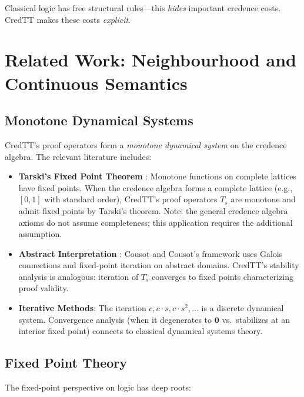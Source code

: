 \documentclass[11pt,a4paper]{article}
\newcommand{\zero}{\mathbf{0}}
\begin{document}
Classical logic has free structural rules---this \emph{hides} important credence costs. CredTT makes these costs \emph{explicit}.

\section{Related Work: Neighbourhood and Continuous Semantics}

\subsection{Monotone Dynamical Systems}

CredTT's proof operators form a \emph{monotone dynamical system} on the credence algebra. The relevant literature includes:

\begin{itemize}
    \item \textbf{Tarski's Fixed Point Theorem} \citep{tarski1955lattice}: Monotone functions on complete lattices have fixed points. When the credence algebra forms a complete lattice (e.g., $[0,1]$ with standard order), CredTT's proof operators $T_s$ are monotone and admit fixed points by Tarski's theorem. Note: the general credence algebra axioms do not assume completeness; this application requires the additional assumption.

    \item \textbf{Abstract Interpretation} \citep{cousot1979constructive}: Cousot and Cousot's framework uses Galois connections and fixed-point iteration on abstract domains. CredTT's stability analysis is analogous: iteration of $T_s$ converges to fixed points characterizing proof validity.

    \item \textbf{Iterative Methods}: The iteration $c, c \cdot s, c \cdot s^2, \ldots$ is a discrete dynamical system. Convergence analysis (when it degenerates to $\zero$ vs.\ stabilizes at an interior fixed point) connects to classical dynamical systems theory.
\end{itemize}

\subsection{Fixed Point Theory}

The fixed-point perspective on logic has deep roots:
\end{document}
